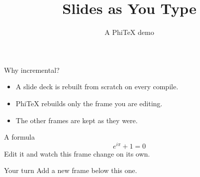 \documentclass{beamer}
\title{Slides as You Type}
\author{A PhiTeX demo}
\date{}
\begin{document}
\begin{frame}
  \titlepage
\end{frame}

\begin{frame}{Why incremental?}
  \begin{itemize}
    \item A slide deck is rebuilt from scratch on every compile.
    \item PhiTeX rebuilds only the frame you are editing.
    \item The other frames are kept as they were.
  \end{itemize}
\end{frame}

\begin{frame}{A formula}
  \[
    e^{i\pi} + 1 = 0
  \]
  Edit it and watch this frame change on its own.
\end{frame}

\begin{frame}{Your turn}
  Add a new frame below this one.
\end{frame}
\end{document}
